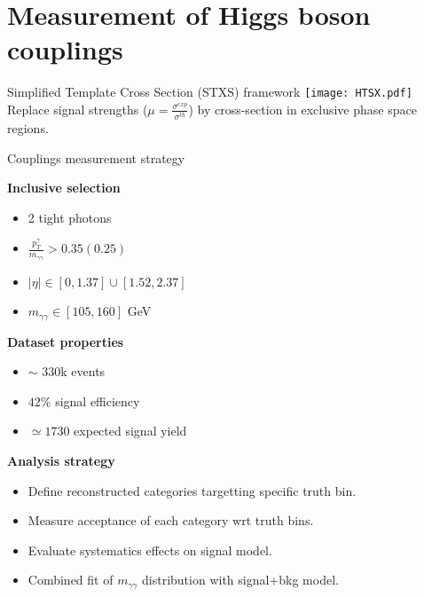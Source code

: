 \section{Measurement of Higgs boson couplings}
\frame{\tableofcontents[currentsection]}

\begin{frame}{Simplified Template Cross Section (STXS) framework}
  \centering
  \texttt{[image: HTSX.pdf]}\\
  Replace signal strengths ($\mu=\frac{\sigma^{exp}}{\sigma^{th}}$) by cross-section in exclusive phase space regions.
\end{frame}
\begin{frame}{Couplings measurement strategy}

  \begin{minipage}{0.49\linewidth}
  {\bf Inclusive selection }
  \begin{itemize}
  \item 2 tight photons
  \item $\frac{p_T^\gamma}{m_{\gamma\gamma}}>0.35 (0.25)$
  \item $|\eta|\in [0, 1.37]  \cup [1.52, 2.37]$
  \item $m_{\gamma\gamma} \in [105, 160]$ GeV
  \end{itemize}
  \end{minipage}
  \hfill
  \begin{minipage}{0.49\linewidth}
    {\bf Dataset properties}  

    \begin{itemize}
    \item $\sim$ 330k events
    \item $42\%$ signal efficiency
    \item $\simeq 1730$ expected signal yield
    \end{itemize}
  \end{minipage}
  \vfill
  {\bf Analysis strategy } 
  \begin{itemize}
  \item Define reconstructed categories targetting specific truth bin.
  \item Measure acceptance of each category wrt truth bins.
  \item Evaluate systematics effects on signal model.
  \item Combined fit of $m_{\gamma\gamma}$ distribution with signal+bkg model.
  \end{itemize}

\end{frame}

